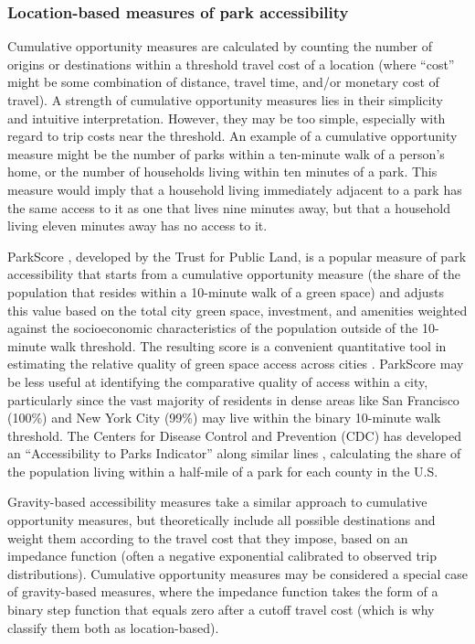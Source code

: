 \documentclass[3p, authoryear, review]{elsarticle} %
\begin{document}
\hypertarget{location-based-measures-of-park-accessibility}{%
\subsubsection{Location-based measures of park accessibility}\label{location-based-measures-of-park-accessibility}}

Cumulative opportunity measures are calculated by counting the number of origins
or destinations within a threshold travel cost of a location (where ``cost'' might
be some combination of distance, travel time, and/or monetary cost of travel). A
strength of cumulative opportunity measures lies in their simplicity and
intuitive interpretation. However, they may be too simple, especially with
regard to trip costs near the threshold. An example of a cumulative opportunity
measure might be the number of parks within a ten-minute walk of a person's
home, or the number of households living within ten minutes of a park. This
measure would imply that a household living immediately adjacent to a park has
the same access to it as one that lives nine minutes away, but that a household
living eleven minutes away has no access to it.

ParkScore \citep{parkscore2019}, developed by the Trust for Public Land, is a popular
measure of park accessibility that starts from a cumulative opportunity measure
(the share of the population that resides within a 10-minute walk of a green
space) and adjusts this value based on the total city green space, investment,
and amenities weighted against the socioeconomic characteristics of the
population outside of the 10-minute walk threshold. The resulting score is a
convenient quantitative tool in estimating the relative quality of green space
access across cities \citep{Rigolon2018}. ParkScore may be less useful at identifying
the comparative quality of access within a city, particularly since the vast
majority of residents in dense areas like San Francisco (100\%) and New York City
(99\%) may live within the binary 10-minute walk threshold. The Centers for
Disease Control and Prevention (CDC) has developed an ``Accessibility to Parks
Indicator'' along similar lines \citep{Ussery2016}, calculating the share of the
population living within a half-mile of a park for each county in the U.S.

Gravity-based accessibility measures take a similar approach to cumulative
opportunity measures, but theoretically include all possible destinations and
weight them according to the travel cost that they impose, based on an impedance
function (often a negative exponential calibrated to observed trip
distributions). Cumulative opportunity measures may be considered a special case
of gravity-based measures, where the impedance function takes the form of a
binary step function that equals zero after a cutoff travel cost (which is why
\citet{GEURS2004127} classify them both as location-based).
\end{document}
